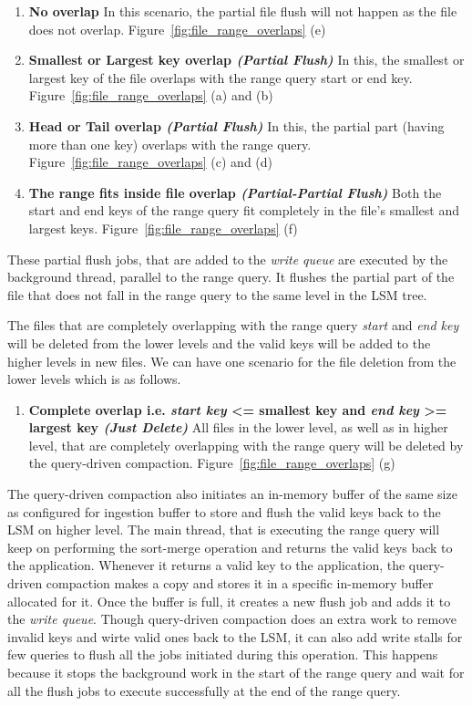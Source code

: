 \begin{enumerate}[leftmargin=*,labelindent=0mm, itemsep=0.2\baselineskip]
    \item \textbf{No overlap} In this scenario, the partial file flush will not happen as the file does not overlap. 
    Figure~\ref{fig:file_range_overlaps} (e)
    \item \textbf{Smallest or Largest key overlap \textit{(Partial Flush)}} In this, the smallest or largest key of the 
    file overlaps with the range query start or end key. Figure~\ref{fig:file_range_overlaps} (a) and (b)
    \item \textbf{Head or Tail overlap \textit{(Partial Flush)}} In this, the partial part (having more than one key) 
    overlaps with the range query. Figure~\ref{fig:file_range_overlaps} (c) and (d)
    \item \textbf{The range fits inside file overlap \textit{(Partial-Partial Flush)}} Both the start and end keys of 
    the range query fit completely in the file's smallest and largest keys. Figure~\ref{fig:file_range_overlaps} (f)
\end{enumerate}

These partial flush jobs, that are added to the \textit{write queue} are executed by the background thread, 
parallel to the range query. It flushes the partial part of the file that does not fall in the range query to the same 
level in the LSM tree.

The files that are completely overlapping with the range query \textit{start} and \textit{end key} will be deleted from the lower 
levels and the valid keys will be added to the higher levels in new files. We can have one scenario for the file 
deletion from the lower levels which is as follows.

\begin{enumerate}
    \item \textbf{Complete overlap i.e. \textit{start key} <= smallest key and \textit{end key} >= largest key 
    \textit{(Just Delete)}} All files in the lower level, as well as in higher level, that are completely overlapping 
    with the range query will be deleted by the query-driven compaction. Figure~\ref{fig:file_range_overlaps} (g)
\end{enumerate}
The query-driven compaction also initiates an in-memory buffer of the same size as configured for ingestion buffer to store
and flush the valid keys back to the LSM on higher level. The main thread, that is executing the range 
query will keep on performing the sort-merge operation and returns the valid keys back to the application. Whenever it 
returns a valid key to the application, the query-driven compaction makes a copy and stores it in a specific in-memory 
buffer allocated for it. Once the buffer is full, it creates a new flush job and adds it to the \textit{write queue}. 
Though query-driven compaction does an extra work to remove invalid keys and wirte valid ones back to the LSM, it can 
also add write stalls for few queries to flush all the jobs initiated during this 
operation. This happens because it stops the background work in the start of the range query and wait for all the flush 
jobs to execute successfully at the end of the range query.

